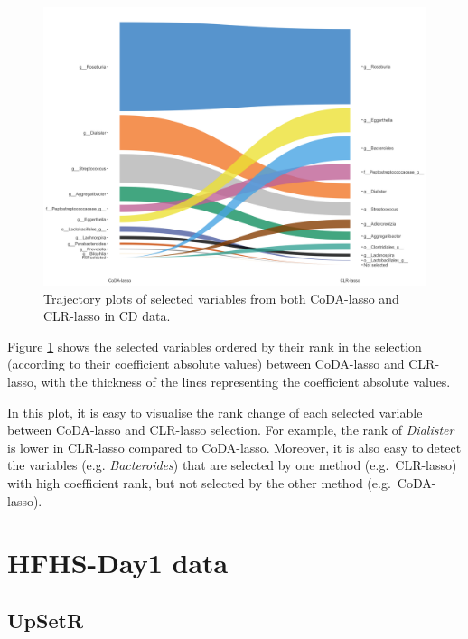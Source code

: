 \documentclass[openany]{book}
\begin{document}
\begin{figure}

{\centering \includegraphics[width=1\linewidth]{./Generated_plots/trajCD-1} 

}

\caption{Trajectory plots of selected variables from both CoDA-lasso and CLR-lasso in CD data.}\label{fig:trajCD}
\end{figure}

Figure \ref{fig:trajCD} shows the selected variables ordered by their
rank in the selection (according to their coefficient absolute values)
between CoDA-lasso and CLR-lasso, with the thickness of the lines
representing the coefficient absolute values.

In this plot, it is easy to visualise the rank change of each selected
variable between CoDA-lasso and CLR-lasso selection. For example, the
rank of \emph{Dialister} is lower in CLR-lasso compared to CoDA-lasso.
Moreover, it is also easy to detect the variables (e.g.
\emph{Bacteroides}) that are selected by one method (e.g.~CLR-lasso)
with high coefficient rank, but not selected by the other method
(e.g.~CoDA-lasso).

\section{HFHS-Day1 data}\label{hfhs-day1-data-3}

\subsection{UpSetR}\label{upsetr-1}
\end{document}
